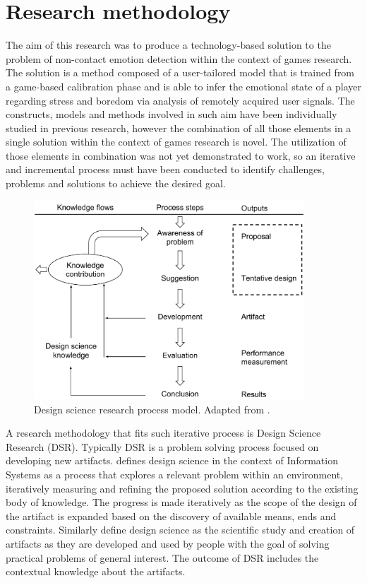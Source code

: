 \chapter{Research methodology}
\label{ch:methodology}

The aim of this research was to produce a technology-based solution to the problem of non-contact emotion detection within the context of games research. The solution is a method composed of a user-tailored model that is trained from a game-based calibration phase and is able to infer the emotional state of a player regarding stress and boredom via analysis of remotely acquired user signals. The constructs, models and methods involved in such aim have been individually studied in previous research, however the combination of all those elements in a single solution within the context of games research is novel. The utilization of those elements in combination was not yet demonstrated to work, so an iterative and incremental process must have been conducted to identify challenges, problems and solutions to achieve the desired goal.

\begin{figure}[h]
    \centering
    \includegraphics[width=0.9\textwidth]{Content/figures/vaishnavi-design-science-process-model}
    \caption{Design science research process model. Adapted from \textcite{vaishnavi2015design}.}
    \label{fig:vaishnavi-design-science-process-model}
\end{figure}

A research methodology that fits such iterative process is Design Science Research (DSR). Typically DSR is a problem solving process focused on developing new artifacts. \textcite{hevner2004design} defines design science in the context of Information Systems as a process that explores a relevant problem within an environment, iteratively measuring and refining the proposed solution according to the existing body of knowledge. The progress is made iteratively as the scope of the design of the artifact is expanded based on the discovery of available means, ends and constraints. Similarly \textcite{johannesson2014introduction} define design science as the scientific study and creation of artifacts as they are developed and used by people with the goal of solving practical problems of general interest. The outcome of DSR includes the contextual knowledge about the artifacts.

